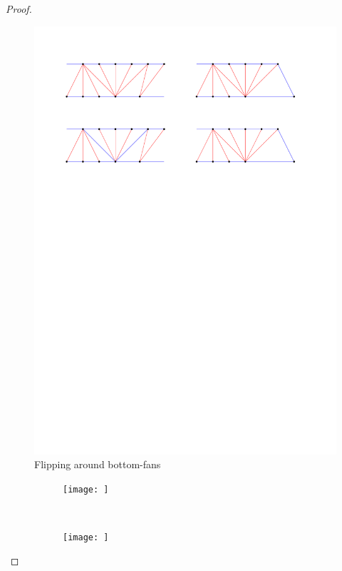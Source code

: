 \begin{proof}
  \begin{figure}[h]
    \centering
    \includegraphics[scale=1]{unifiedAlgo/img/bottomFanFlips}
    \caption{Flipping around bottom-fans}
    \label{fig:uni:bottomFanFlips}
  \end{figure}

  \begin{figure}
      \centering
      \begin{subfigure}[b]{0.45textwidth}
          \texttt{[image: ]}
          \caption{}
      \end{subfigure}
      ~
      \begin{subfigure}[b]{0.45textwidth}
          \texttt{[image: ]}
          \caption{}
      \end{subfigure}
      	\caption{}
  \label{fig:uni:undesirableStructures}
  \end{figure}
\end{proof}
